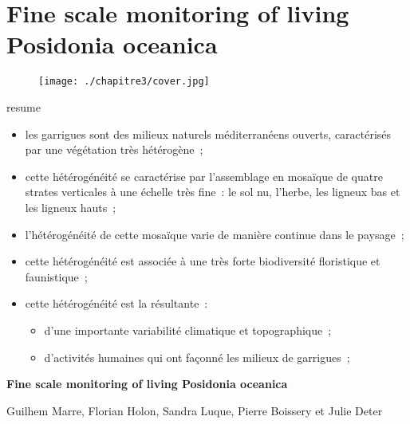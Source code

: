 \chapter{Fine scale monitoring of living Posidonia oceanica} \label{chapitre3-deep}

\pagestyle{main}
\begin{figure}[H] 
	\begin{center}
	\texttt{[image: ./chapitre3/cover.jpg]}
    \end{center}
\end{figure}

\begin{colbox}{resume}
  \vspace{-2pt}
{\color{textresume}\small
\begin{itemize}[leftmargin=0in]\itemsep3pt
\item les garrigues sont des milieux naturels méditerranéens ouverts, caractérisés par une végétation très hétérogène~;
\item cette hétérogénéité se caractérise par l'assemblage en mosaïque de quatre strates verticales à une échelle très fine~: le sol nu, l'herbe, les ligneux bas et les ligneux hauts~;
\item l'hétérogénéité de cette mosaïque varie de manière continue dans le paysage~;
\item cette hétérogénéité est associée à une très forte biodiversité floristique et faunistique~;
\item cette hétérogénéité est la résultante~:
\begin{itemize}
  \item d'une importante variabilité climatique et topographique~;
  \item d'activités humaines qui ont façonné les milieux de garrigues~;
\end{itemize}
\end{itemize}
}
\vspace{-2pt}
\end{colbox}

\clearpage

\noindent\textbf{Fine scale monitoring of living Posidonia oceanica}

\noindent Guilhem Marre, Florian Holon, Sandra Luque, Pierre Boissery et Julie Deter

